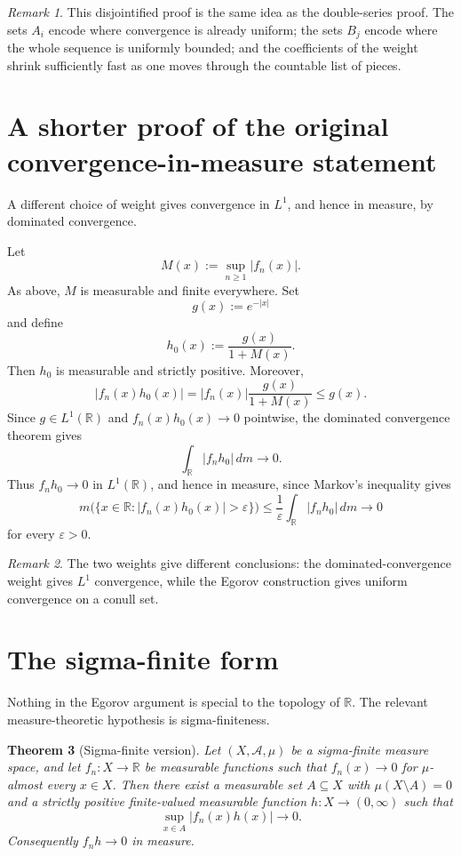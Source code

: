 \documentclass[11pt]{article}
\newcommand{\R}{\mathbb{R}}
\newcommand{\eps}{\varepsilon}
\newcommand{\mc}[1]{\mathcal{#1}}
\theoremstyle{plain}
\newtheorem{theorem}{Theorem}[section]
\theoremstyle{definition}
\theoremstyle{remark}
\newtheorem{remark}[theorem]{Remark}
\begin{document}
\begin{remark}
This disjointified proof is the same idea as the double-series proof.  The
sets $A_i$ encode where convergence is already uniform; the sets $B_j$ encode
where the whole sequence is uniformly bounded; and the coefficients of the
weight shrink sufficiently fast as one moves through the countable list of
pieces.
\end{remark}

\section{A shorter proof of the original convergence-in-measure statement}

A different choice of weight gives convergence in $L^1$, and hence in measure,
by dominated convergence.

Let
\[
        M(x):=\sup_{n\geq 1}|f_n(x)|.
\]
As above, $M$ is measurable and finite everywhere.  Set
\[
        g(x):=e^{-|x|}
\]
and define
\[
        h_0(x):=\frac{g(x)}{1+M(x)}.
\]
Then $h_0$ is measurable and strictly positive.  Moreover,
\[
        |f_n(x)h_0(x)|
        =|f_n(x)|\frac{g(x)}{1+M(x)}
        \leq g(x).
\]
Since $g\in L^1(\R)$ and $f_n(x)h_0(x)\to 0$ pointwise, the dominated
convergence theorem gives
\[
        \int_{\R}|f_nh_0|\,dm\longrightarrow 0.
\]
Thus $f_nh_0\to 0$ in $L^1(\R)$, and hence in measure, since Markov's
inequality gives
\[
        m\bigl(\{x\in\R:|f_n(x)h_0(x)|>\eps\}\bigr)
        \leq
        \frac{1}{\eps}\int_{\R}|f_nh_0|\,dm
        \longrightarrow 0
\]
for every $\eps>0$.

\begin{remark}
The two weights give different conclusions: the dominated-convergence weight gives $L^1$
convergence, while the Egorov construction gives uniform convergence on a conull set.
\end{remark}

\section{The sigma-finite form}

Nothing in the Egorov argument is special to the topology of $\R$.  The
relevant measure-theoretic hypothesis is sigma-finiteness.

\begin{theorem}[Sigma-finite version]\label{thm:sigma-finite}
Let $(X,\mc A,\mu)$ be a sigma-finite measure space, and let
$f_n:X\to\R$ be measurable functions such that $f_n(x)\to 0$ for
$\mu$-almost every $x\in X$.  Then there exist a measurable set $A\subseteq X$
with $\mu(X\setminus A)=0$ and a strictly positive finite-valued measurable
function $h:X\to(0,\infty)$ such that
\[
        \sup_{x\in A}|f_n(x)h(x)|\longrightarrow 0.
\]
Consequently $f_nh\to 0$ in measure.
\end{theorem}
\end{document}
